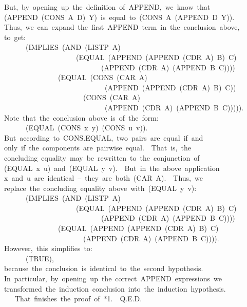 \documentclass[10pt]{book}
\newenvironment{pubasis}{\begin{flushleft}}{\end{flushleft}}
\begin{document}
\begin{pubasis}
~~But,~by~opening~up~the~definition~of~APPEND,~we~know~that\\
~~(APPEND~(CONS~A~D)~Y)~is~equal~to~(CONS~A~(APPEND~D~Y)).\\
~~Thus,~we~can~expand~the~first~APPEND~term~in~the~conclusion~above,\\
~~to~get:\\

~~~~~~~~(IMPLIES~(AND~(LISTP~A)\\
~~~~~~~~~~~~~~~~~~~~~~(EQUAL~(APPEND~(APPEND~(CDR~A)~B)~C)\\
~~~~~~~~~~~~~~~~~~~~~~~~~~~~~(APPEND~(CDR~A)~(APPEND~B~C))))\\
~~~~~~~~~~~~~~~~~(EQUAL~(CONS~(CAR~A)\\
~~~~~~~~~~~~~~~~~~~~~~~~~~~~~~(APPEND~(APPEND~(CDR~A)~B)~C))\\
~~~~~~~~~~~~~~~~~~~~~~~~(CONS~(CAR~A)\\
~~~~~~~~~~~~~~~~~~~~~~~~~~~~~~(APPEND~(CDR~A)~(APPEND~B~C))))).\\

~~Note~that~the~conclusion~above~is~of~the~form:\\

~~~~~~~~(EQUAL~(CONS~x~y)~(CONS~u~v)).\\

~~But~according~to~CONS.EQUAL,~two~pairs~are~equal~if~and\\
~~only~if~the~components~are~pairwise~equal.~~That~is,~the\\
~~concluding~equality~may~be~rewritten~to~the~conjunction~of\\
~~(EQUAL~x~u)~and~(EQUAL~y~v).~~But~in~the~above~application\\
~~x~and~u~are~identical~--~they~are~both~(CAR~A).~~Thus,~we\\
~~replace~the~concluding~equality~above~with~(EQUAL~y~v):\\

~~~~~~~~(IMPLIES~(AND~(LISTP~A)\\
~~~~~~~~~~~~~~~~~~~~~~(EQUAL~(APPEND~(APPEND~(CDR~A)~B)~C)\\
~~~~~~~~~~~~~~~~~~~~~~~~~~~~~(APPEND~(CDR~A)~(APPEND~B~C))))\\
~~~~~~~~~~~~~~~~~(EQUAL~(APPEND~(APPEND~(CDR~A)~B)~C)\\
~~~~~~~~~~~~~~~~~~~~~~~~(APPEND~(CDR~A)~(APPEND~B~C)))).\\

~~However,~this~simplifies~to:\\

~~~~~~~~(TRUE),\\

~~because~the~conclusion~is~identical~to~the~second~hypothesis.\\
~~In~particular,~by~opening~up~the~correct~APPEND~expressions~we\\
~~transformed~the~induction~conclusion~into~the~induction~hypothesis.\\

~~~~~That~finishes~the~proof~of~*1.~~Q.E.D.\\
\end{pubasis}
\end{document}
